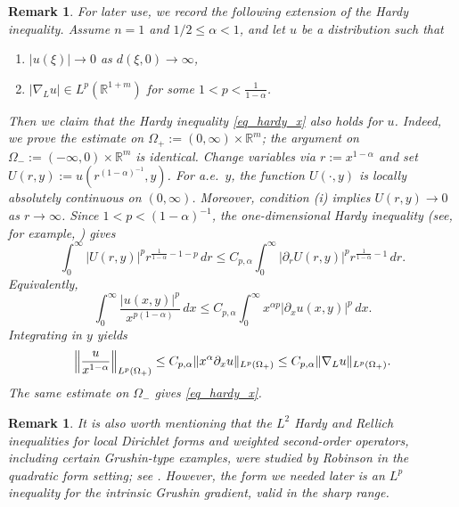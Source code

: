 \documentclass[12pt]{amsart}
\newtheorem{remark}[theorem]{Remark}
\begin{document}
\begin{remark}\label{re:Hardy}
For later use, we record the following extension of the Hardy inequality. Assume $n=1$ and $1/2\leq\alpha<1$, and let $u$ be a distribution such that 
\begin{enumerate}[label=(\roman*)] 
    \item $|u(\xi)| \to 0$ as $d(\xi,0) \to \infty$,
    \item $|\nabla_L u| \in L^p(\mathbb{R}^{1+m})$ for some $1<p<\frac{1}{1-\alpha}$.
\end{enumerate}
Then we claim that the Hardy inequality \eqref{eq_hardy_x} also holds for $u$. Indeed, we prove the estimate on $\Omega_+:=(0,\infty)\times\mathbb R^m$; the
argument on $\Omega_-:=(-\infty,0)\times\mathbb R^m$ is identical. Change variables via $r:=x^{1-\alpha}$ and set $U(r,y):= u(r^{(1-\alpha)^{-1}},y)$. For a.e.\ $y$, the function $U(\cdot,y)$ is locally absolutely continuous on
$(0,\infty)$. Moreover, condition (i) implies $U(r,y)\to 0$ as $r\to \infty$.
Since $1<p<(1-\alpha)^{-1}$, the one-dimensional Hardy inequality (see, for example, \cite[Example~1.2.8]{G}) gives
\begin{equation*}
\int_0^\infty |U(r,y)|^p r^{\frac{1}{1-\alpha}-1-p} \, dr \le C_{p,\alpha} \int_0^\infty |\partial_r U(r,y)|^p r^{\frac{1}{1-\alpha}-1} \, dr.
\end{equation*}
Equivalently,
\begin{equation*}
\int_0^\infty \frac{|u(x,y)|^p}{x^{p(1-\alpha)}} \, dx \le C_{p,\alpha} \int_0^\infty x^{\alpha p}|\partial_x u(x,y)|^p \, dx. 
\end{equation*}
Integrating in $y$ yields
\begin{equation*}
\Bigl\| \frac{u}{x^{1-\alpha}} \Bigr\|_{L^p(\Omega_+)} \le C_{p,\alpha} \|x^\alpha\partial_xu\|_{L^p(\Omega_+)} \le C_{p,\alpha} \| \nabla_L u\|_{L^p(\Omega_+)}.
\end{equation*}
The same estimate on $\Omega_-$ gives \eqref{eq_hardy_x}.
\end{remark}



\begin{remark}
It is also worth mentioning that the $L^2$ Hardy and Rellich inequalities for local Dirichlet forms and weighted second-order operators, including certain Grushin-type examples, were studied by Robinson in the quadratic form setting; see \cite{Robinson_Hardy}. However, the form we needed later is an $L^p$ inequality for the intrinsic Grushin gradient, valid in the sharp range. 
\end{remark}
\end{document}
